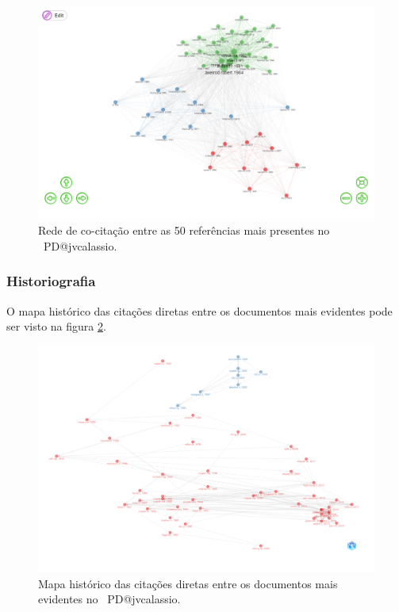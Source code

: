 \begin{figure}
    \centering
    \includegraphics[width=1\textwidth]{exploratory-data-analysis/jvcalassio/PesqBibliogr/PrisonersDilemma/WoS-20221201/Dataset/Co-citation-Network-Papers-2022-12-03.png}
    \caption{Rede de co-citação entre as 50 referências mais presentes no  \dataset\ PD@jvcalassio.}
    \label{fig:PD@jvcalassio:CoCitation-Network}
\end{figure}

\subsubsection{Historiografia}

O mapa histórico das citações diretas entre os documentos mais evidentes pode ser visto na figura \ref{fig:PD@jvcalassio:HistoricalDirectCitationNetwork-50docs}.

\begin{figure}
    \centering
    \includegraphics[width=1\textwidth]{exploratory-data-analysis/jvcalassio/PesqBibliogr/PrisonersDilemma/WoS-20221201/Dataset/Historiograph-2022-12-03.png}
    \caption{Mapa histórico das citações diretas entre os documentos mais evidentes no  \dataset\ PD@jvcalassio.}
    \label{fig:PD@jvcalassio:HistoricalDirectCitationNetwork-50docs}
\end{figure}

